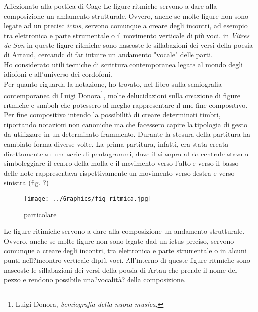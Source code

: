 Affezionato alla poetica di Cage 
Le figure ritmiche servono a dare alla composizione un andamento strutturale. Ovvero, anche se molte figure non sono legate ad un preciso \textit{ictus}, servono comunque a creare degli incontri, ad esempio tra elettronica e parte strumentale o il movimento verticale di più voci. in \textit{Vitres de Son} in queste figure ritmiche sono nascoste le sillabazioni dei versi della poesia di Artaud, cercando di far intuire un andamento "vocale" delle parti. \\
Ho considerato utili tecniche di scrittura contemporanea legate al mondo degli idiofoni e all'universo dei cordofoni. \\
Per quanto riguarda la notazione, ho trovato, nel libro sulla semiografia contemporanea di Luigi Donora\footnote{Luigi Donora, \textit{Semiografia della nuova musica}, }, molte delucidazioni sulla creazione di figure ritmiche e simboli che potessero al meglio rappresentare il mio fine compositivo. Per fine compositivo intendo la possibilità di creare determinati timbri, riportando notazioni non canoniche ma che facessero capire la tipologia di gesto da utilizzare in un determinato frammento. Durante la stesura della partitura ha cambiato forma diverse volte. La prima partitura, infatti, era stata creata direttamente su una serie di pentagrammi, dove il si sopra al do centrale stava a simboleggiare il centro della molla e il movimento verso l'alto e verso il basso delle note rappresentava rispettivamente un movimento verso destra e verso sinistra (fig. ?)


\begin{figure}[htbp]
\begin{center}
\texttt{[image: ../Graphics/fig\_ritmica.jpg]}
\caption{particolare}
\label{default}
\end{center}
\end{figure}

Le figure ritimiche servono a dare alla composizione un andamento strutturale. Ovvero, anche se molte figure non sono legate dad un ictus preciso, servono comunque a creare degli incontri, tra elettronica e parte strumentale o in alcuni punti nell?incontro verticale dipiù voci. All'interno di queste figure ritmiche sono nascoste le sillabazioni dei versi della poesia di Artau che prende
il nome del pezzo e rendono possibile una?vocalità? della composizione.

